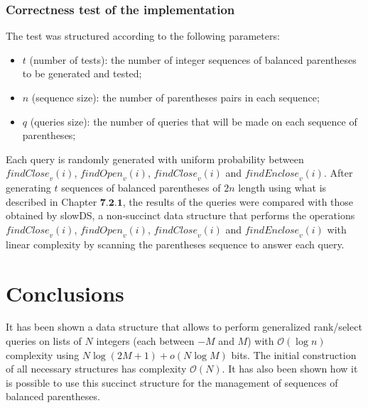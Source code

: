 \documentclass{article}
\begin{document}
\subsubsection{Correctness test of the implementation}
The test was structured according to the following parameters:
    \begin{itemize}
        \item $t$ (number of tests): the number of integer sequences of balanced parentheses to be generated and tested;
        \item $n$ (sequence size): the number of parentheses pairs in each sequence;
        \item $q$ (queries size): the number of queries that will be made on each sequence of parentheses; 
    \end{itemize}
Each query is randomly generated with uniform probability between $\mathit{findClose}_v(i)$, $\mathit{findOpen}_v(i)$, $\mathit{findClose}_v(i)$ and $\mathit{findEnclose}_v(i)$. After generating $t$ sequences of balanced parentheses of $2n$ length using what is described in Chapter $\textbf{7.2.1}$, the results of the queries were compared with those obtained by slowDS, a non-succinct data structure that performs the operations $\mathit{findClose}_v(i)$, $\mathit{findOpen}_v(i)$, $\mathit{findClose}_v(i)$ and  $\mathit{findEnclose}_v(i)$ with linear complexity by scanning the parentheses sequence to answer each query.

\section{Conclusions}
It has been shown a data structure that allows to perform generalized rank/select queries on lists of $N$ integers (each between $-M$ and $M$) with $\mathcal{O}(\log{n})$ complexity using $N\log{(2M+1)}+o(N\log{M})$ bits. The initial construction of all necessary structures has complexity $\mathcal{O}(N)$. It has also been shown how it is possible to use this succinct structure for the management of sequences of balanced parentheses.
\end{document}
